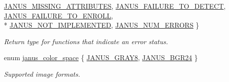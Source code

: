 \begin{DoxyCompactItemize}
\hyperlink{group__janus_gga1b275e4dade484951b366f785597b8f6aa4c0854ce7d2d0c12ec33af8a37a55fd}{J\+A\+N\+U\+S\+\_\+\+M\+I\+S\+S\+I\+N\+G\+\_\+\+A\+T\+T\+R\+I\+B\+U\+T\+E\+S}, 
\hyperlink{group__janus_gga1b275e4dade484951b366f785597b8f6a4243e7aae5114b32c01325bc5952d7b6}{J\+A\+N\+U\+S\+\_\+\+F\+A\+I\+L\+U\+R\+E\+\_\+\+T\+O\+\_\+\+D\+E\+T\+E\+C\+T}, 
\hyperlink{group__janus_gga1b275e4dade484951b366f785597b8f6aed03c0e4fc7eb92d37277769beb3b884}{J\+A\+N\+U\+S\+\_\+\+F\+A\+I\+L\+U\+R\+E\+\_\+\+T\+O\+\_\+\+E\+N\+R\+O\+L\+L}, 
\\*
\hyperlink{group__janus_gga1b275e4dade484951b366f785597b8f6ae8d1090a68bff69a7994bbc6039d88f9}{J\+A\+N\+U\+S\+\_\+\+N\+O\+T\+\_\+\+I\+M\+P\+L\+E\+M\+E\+N\+T\+E\+D}, 
\hyperlink{group__janus_gga1b275e4dade484951b366f785597b8f6aaf8ac4cbc3eef923e396aa7dc9b364cf}{J\+A\+N\+U\+S\+\_\+\+N\+U\+M\+\_\+\+E\+R\+R\+O\+R\+S}
 \}\begin{DoxyCompactList}\small\item\em Return type for functions that indicate an error status. \end{DoxyCompactList}
\item 
enum \hyperlink{group__janus_gac189bebcbab53c752990509cb48ccd4c}{janus\+\_\+color\+\_\+space} \{ \hyperlink{group__janus_ggac189bebcbab53c752990509cb48ccd4ca6914ab831ea319e4837d0aed95cc9f45}{J\+A\+N\+U\+S\+\_\+\+G\+R\+A\+Y8}, 
\hyperlink{group__janus_ggac189bebcbab53c752990509cb48ccd4ca5755eebe0c5461a890145a0ad5d68a7c}{J\+A\+N\+U\+S\+\_\+\+B\+G\+R24}
 \}\begin{DoxyCompactList}\small\item\em Supported image formats. \end{DoxyCompactList}
\end{DoxyCompactItemize}
